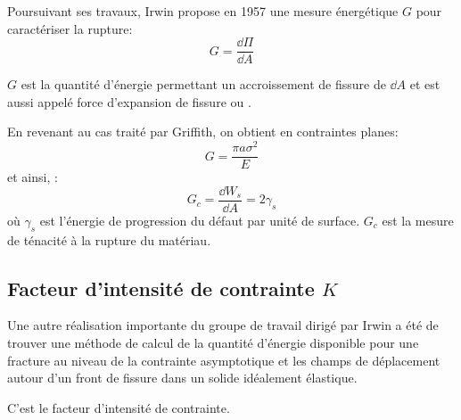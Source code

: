\medskip
Poursuivant ses travaux, Irwin propose en 1957
une mesure énergétique $G$ pour caractériser la rupture:
\begin{equation} G = \dfrac{\dd\Pi}{\dd A} \end{equation}

$G$ est la quantité d'énergie permettant un accroissement de fissure de $\dd A$ et est aussi appelé
force d'expansion de fissure ou .

\medskip
En revenant au cas traité par Griffith, on obtient
en contraintes planes:
\begin{equation} G = \dfrac{\pi a\sigma^2}{E} \end{equation}
et ainsi, :
\begin{equation} G_c = \dfrac{\dd W_s}{\dd A}=2\gamma_s \end{equation}
où $\gamma_s$ est l'énergie de progression du défaut par unité de surface.
$G_c$ est la mesure de ténacité à la rupture du matériau.


\medskip
\subsection{Facteur d'intensité de contrainte $K$}

\medskip
\begin{histoire}%
Une autre réalisation importante du groupe de travail dirigé par Irwin a été de trouver une méthode
de calcul de la quantité d'énergie disponible pour une fracture au niveau de la contrainte asymptotique
et les champs de déplacement autour d'un front de fissure dans un solide idéalement élastique.

C'est le  facteur d'intensité de contrainte.
\end{histoire}

